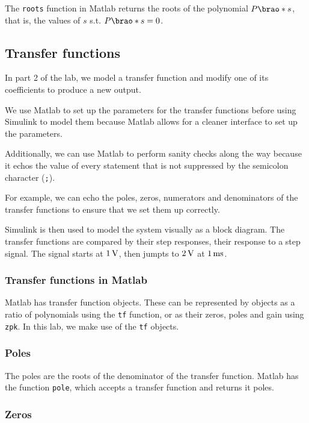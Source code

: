 \documentclass[12pt]{article}
\DeclarePairedDelimiter\brao()%
\begin{document}
The \texttt{roots} function in Matlab returns the roots of the polynomial $P\brao*s$, that is, the values of $s$ s.t. $P\brao*s = 0$.

\subsection{Transfer functions}

In part 2 of the lab, we model a transfer function and modify one of its coefficients to produce a new output.

We use Matlab to set up the parameters for the transfer functions before using Simulink to model them because Matlab allows for a cleaner interface to set up the parameters.

Additionally, we can use Matlab to perform sanity checks along the way because it echos the value of every statement that is not suppressed by the semicolon character (\texttt{;}).

For example, we can echo the poles, zeros, numerators and denominators of the transfer functions to ensure that we set them up correctly.

Simulink is then used to model the system visually as a block diagram.
The transfer functions are compared by their step responses, their response to a step signal.
The signal starts at $\SI1\volt$, then jumpts to $\SI2\volt$ at $\SI1{\milli\second}$.

\subsubsection{Transfer functions in Matlab}

Matlab has transfer function objects.
These can be represented by objects as a ratio of polynomials using the \texttt{tf} function,
or as their zeros, poles and gain using \texttt{zpk}.
In this lab, we make use of the \texttt{tf} objects.

\subsubsection{Poles}

The poles are the roots of the denominator of the transfer function.
Matlab has the function \texttt{pole},
which accepts a transfer function and returns it poles.

\subsubsection{Zeros}
\end{document}
